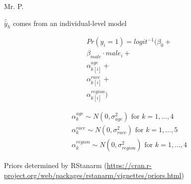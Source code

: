 \documentclass[aspectratio=169]{beamer}
\begin{document}
\begin{frame}{Mr. P.}

$\hat{\bar{y}}_h$ comes from an individual-level model

\begin{align*}
Pr(y_i = 1) = logit^{-1} (\beta_0 + \\
 \beta_{male} \cdot male_i + \\
 \alpha_{k[i]}^{age} + \\
 \alpha_{k[i]}^{race} + \\
 \alpha_{k[i]}^{region})
\end{align*}

\begin{align*}
\alpha_{k}^{age} \sim N(0, \sigma^2_{age}) \text{ for } k = 1, \ldots, 4 \\
\alpha_{k}^{race} \sim N(0, \sigma^2_{race}) \text{ for } k = 1, \ldots, 5 \\
\alpha_{k}^{region}  \sim N(0, \sigma^2_{region}) \text{ for } k = 1, \ldots, 4
\end{align*}

Priors determined by RStanarm (\url{https://cran.r-project.org/web/packages/rstanarm/vignettes/priors.html})

\end{frame}
\end{document}
